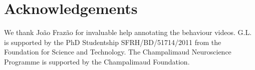 \section{Acknowledgements}

We thank João Frazão for invaluable help annotating the behaviour videos. G.L. is supported by the PhD Studentship SFRH/BD/51714/2011 from the Foundation for Science and Technology. The Champalimaud Neuroscience Programme is supported by the Champalimaud Foundation.